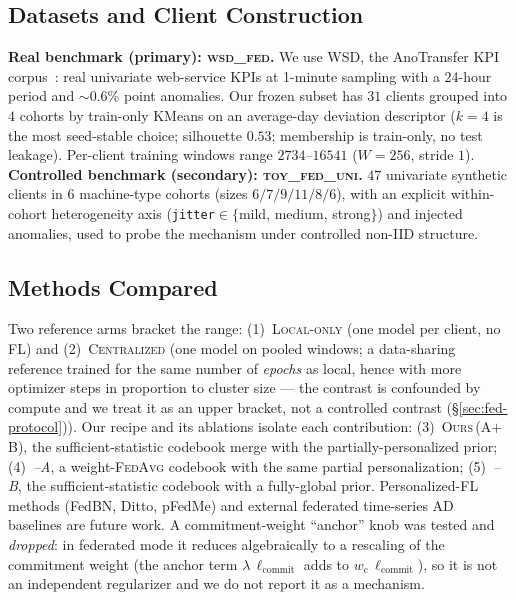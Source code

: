 \subsection{Datasets and Client Construction}
\textbf{Real benchmark (primary): \textsc{wsd\_fed}.} We use WSD, the AnoTransfer KPI
corpus~\cite{anotransfer}: real univariate web-service KPIs at 1-minute sampling with a
24-hour period and $\sim$0.6\% point anomalies. Our frozen subset has $31$ clients grouped
into $4$ cohorts by train-only KMeans on an average-day deviation descriptor
($k{=}4$ is the most seed-stable choice; silhouette $0.53$; membership is train-only, no
test leakage). Per-client training windows range $2734$--$16541$ ($W{=}256$, stride $1$).
\textbf{Controlled benchmark (secondary): \textsc{toy\_fed\_uni}.} $47$ univariate
synthetic clients in $6$ machine-type cohorts (sizes $6/7/9/11/8/6$), with an explicit within-cohort
heterogeneity axis (\texttt{jitter}$\in\{$mild, medium, strong$\}$) and injected anomalies,
used to probe the mechanism under controlled non-IID structure.

\subsection{Methods Compared}
\label{sec:fed-arms}
Two reference arms bracket the range: (1)~\textsc{Local-only} (one model per client, no
FL) and (2)~\textsc{Centralized} (one model on pooled windows; a data-sharing reference
trained for the same number of \emph{epochs} as local, hence with more optimizer steps in
proportion to cluster size --- the contrast is confounded by compute and we treat it as an
upper bracket, not a controlled contrast (\S\ref{sec:fed-protocol})). Our recipe and its ablations isolate each contribution:
(3)~\textsc{Ours\,(A$+$B)}, the sufficient-statistic codebook merge with the
partially-personalized prior; (4)~\emph{--A}, a weight-\textsc{FedAvg} codebook with the
same partial personalization; (5)~\emph{--B}, the sufficient-statistic codebook with a
fully-global prior. Personalized-FL methods (FedBN, Ditto, pFedMe) and external federated
time-series AD baselines are future work. A commitment-weight ``anchor'' knob was tested
and \emph{dropped}: in federated mode it reduces algebraically to a rescaling of the
commitment weight (the anchor term $\lambda\,\ell_{\mathrm{commit}}$ adds to
$w_{\mathrm{c}}\,\ell_{\mathrm{commit}}$), so it is not an independent regularizer and we do
not report it as a mechanism.

